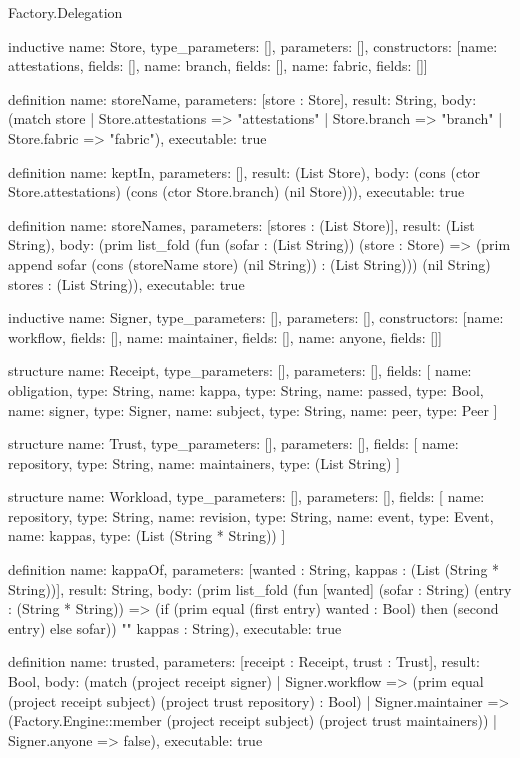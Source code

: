 \begin{lexlean}{Factory.Delegation}
\begin{semanticmodule}
inductive{
  name: Store,
  type_parameters: [],
  parameters: [],
  constructors: [{name: attestations, fields: []}, {name: branch, fields: []}, {name: fabric, fields: []}]
}

definition{
  name: storeName,
  parameters: [store : Store],
  result: String,
  body: (match store
    | Store.attestations => "attestations"
    | Store.branch => "branch"
    | Store.fabric => "fabric"),
  executable: true
}

definition{
  name: keptIn,
  parameters: [],
  result: (List Store),
  body: (cons (ctor Store.attestations) (cons (ctor Store.branch) (nil Store))),
  executable: true
}

definition{
  name: storeNames,
  parameters: [stores : (List Store)],
  result: (List String),
  body: (prim list_fold (fun (sofar : (List String)) (store : Store) => (prim append sofar (cons (storeName store) (nil String)) : (List String))) (nil String) stores : (List String)),
  executable: true
}

inductive{
  name: Signer,
  type_parameters: [],
  parameters: [],
  constructors: [{name: workflow, fields: []}, {name: maintainer, fields: []}, {name: anyone, fields: []}]
}

structure{
  name: Receipt,
  type_parameters: [],
  parameters: [],
  fields: [
    {name: obligation, type: String},
    {name: kappa, type: String},
    {name: passed, type: Bool},
    {name: signer, type: Signer},
    {name: subject, type: String},
    {name: peer, type: Peer}
  ]
}

structure{
  name: Trust,
  type_parameters: [],
  parameters: [],
  fields: [
    {name: repository, type: String},
    {name: maintainers, type: (List String)}
  ]
}

structure{
  name: Workload,
  type_parameters: [],
  parameters: [],
  fields: [
    {name: repository, type: String},
    {name: revision, type: String},
    {name: event, type: Event},
    {name: kappas, type: (List (String * String))}
  ]
}

definition{
  name: kappaOf,
  parameters: [wanted : String, kappas : (List (String * String))],
  result: String,
  body: (prim list_fold (fun [wanted] (sofar : String) (entry : (String * String)) => (if (prim equal (first entry) wanted : Bool) then (second entry) else sofar)) "" kappas : String),
  executable: true
}

definition{
  name: trusted,
  parameters: [receipt : Receipt, trust : Trust],
  result: Bool,
  body: (match (project receipt signer)
      | Signer.workflow => (prim equal (project receipt subject) (project trust repository) : Bool)
      | Signer.maintainer => (Factory.Engine::member (project receipt subject) (project trust maintainers))
      | Signer.anyone => false),
  executable: true
}


\end{semanticmodule}
\end{lexlean}
